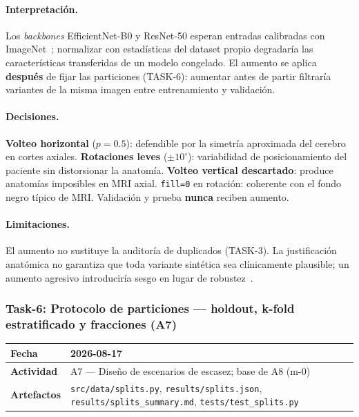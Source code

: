 \paragraph{Interpretación.}
Los \textit{backbones} EfficientNet-B0 y ResNet-50 esperan entradas calibradas con
ImageNet~\cite{tan2019efficientnet}; normalizar con estadísticas del dataset propio
degradaría las características transferidas de un modelo congelado. El aumento se
aplica \textbf{después} de fijar las particiones (TASK-6): aumentar antes de partir
filtraría variantes de la misma imagen entre entrenamiento y validación.

\paragraph{Decisiones.}
\textbf{Volteo horizontal} ($p=0.5$): defendible por la simetría aproximada del cerebro
en cortes axiales. \textbf{Rotaciones leves} ($\pm 10^\circ$): variabilidad de
posicionamiento del paciente sin distorsionar la anatomía. \textbf{Volteo vertical
descartado}: produce anatomías imposibles en MRI axial. \texttt{fill=0} en rotación:
coherente con el fondo negro típico de MRI. Validación y prueba \textbf{nunca} reciben
aumento.

\paragraph{Limitaciones.}
El aumento no sustituye la auditoría de duplicados (TASK-3). La justificación anatómica
no garantiza que toda variante sintética sea clínicamente plausible; un aumento agresivo
introduciría sesgo en lugar de robustez~\cite{willemink2020preparing}.

\subsubsection{Task-6: Protocolo de particiones — holdout, k-fold estratificado y fracciones (A7)}
\label{hallazgo:task-6}
\begin{tabularx}{\textwidth}{|l|X|}\hline
\textbf{Fecha} & 2026-08-17 \\\hline
\textbf{Actividad} & A7 --- Diseño de escenarios de escasez; base de A8 (m-0) \\\hline
\textbf{Artefactos} & \texttt{src/data/splits.py}, \texttt{results/splits.json}, \texttt{results/splits\_summary.md}, \texttt{tests/test\_splits.py} \\\hline
\end{tabularx}


